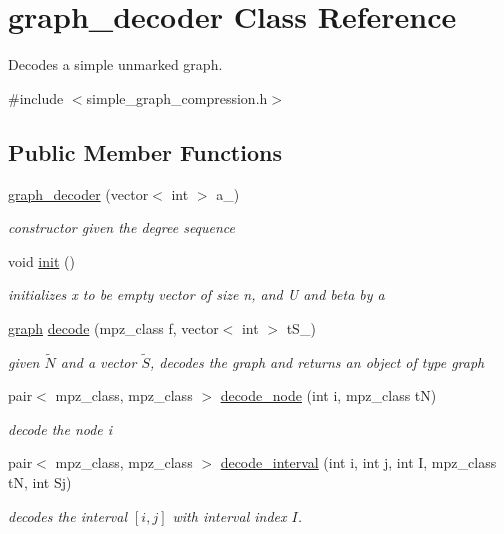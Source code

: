 \hypertarget{classgraph__decoder}{}\section{graph\+\_\+decoder Class Reference}
\label{classgraph__decoder}


Decodes a simple unmarked graph.  




{\ttfamily \#include $<$simple\+\_\+graph\+\_\+compression.\+h$>$}

\subsection*{Public Member Functions}
\begin{DoxyCompactItemize}
\item 
\hyperlink{classgraph__decoder_a41aa2f322a170376a7904b008e9cdfe0}{graph\+\_\+decoder} (vector$<$ int $>$ a\+\_\+)
\begin{DoxyCompactList}\small\item\em constructor given the degree sequence \end{DoxyCompactList}\item 
void \hyperlink{classgraph__decoder_a97a9dcd5af21ece86fa91adcb41ca9cc}{init} ()
\begin{DoxyCompactList}\small\item\em initializes x to be empty vector of size n, and U and beta by a \end{DoxyCompactList}\item 
\hyperlink{classgraph}{graph} \hyperlink{classgraph__decoder_a3d2ef81ec6ac66e50c1809f361143922}{decode} (mpz\+\_\+class f, vector$<$ int $>$ t\+S\+\_\+)
\begin{DoxyCompactList}\small\item\em given $\tilde{N}$ and a vector $\tilde{S}$, decodes the graph and returns an object of type graph \end{DoxyCompactList}\item 
pair$<$ mpz\+\_\+class, mpz\+\_\+class $>$ \hyperlink{classgraph__decoder_af3ff99a4de6035ad257ebd7c6519cdd8}{decode\+\_\+node} (int i, mpz\+\_\+class tN)
\begin{DoxyCompactList}\small\item\em decode the node i \end{DoxyCompactList}\item 
pair$<$ mpz\+\_\+class, mpz\+\_\+class $>$ \hyperlink{classgraph__decoder_a2cb0bd279889a833d4c825e99eb72410}{decode\+\_\+interval} (int i, int j, int I, mpz\+\_\+class tN, int Sj)
\begin{DoxyCompactList}\small\item\em decodes the interval $[i,j]$ with interval index $I$. \end{DoxyCompactList}\end{DoxyCompactItemize}
